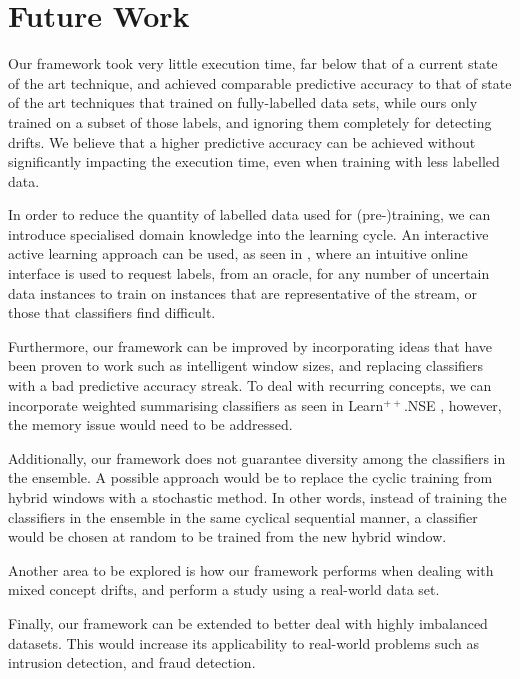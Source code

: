 
\section{Future Work}
Our framework took very little execution time, far below that of a current state of the art technique, and achieved comparable predictive accuracy to that of state of the art techniques that trained on fully-labelled data sets, while ours only trained on a subset of those labels, and ignoring them completely for detecting drifts. We believe that a higher predictive accuracy can be achieved without significantly impacting the execution time, even when training with less labelled data.

In order to reduce the quantity of labelled data used for (pre-)training, we can introduce specialised domain knowledge into the learning cycle. An interactive active learning approach can be used, as seen in \cite{floyd2017activetext}, where an intuitive online interface is used to request labels, from an oracle, for any number of uncertain data instances to train on instances that are representative of the stream, or those that classifiers find difficult.

Furthermore, our framework can be improved by incorporating ideas that have been proven to work such as intelligent window sizes, and replacing classifiers with a bad predictive accuracy streak. To deal with recurring concepts, we can incorporate weighted summarising classifiers as seen in Learn$^{++}$.NSE \cite{elwell2011incremental}, however, the memory issue would need to be addressed.

Additionally, our framework does not guarantee diversity among the classifiers in the ensemble. A possible approach would be to replace the cyclic training from hybrid windows with a stochastic method. In other words, instead of training the classifiers in the ensemble in the same cyclical sequential manner, a classifier would be chosen at random to be trained from the new hybrid window.

Another area to be explored is how our framework performs when dealing with mixed concept drifts, and perform a study using a real-world data set.

Finally, our framework can be extended to better deal with highly imbalanced datasets. This would increase its applicability to real-world problems such as intrusion detection, and fraud detection.